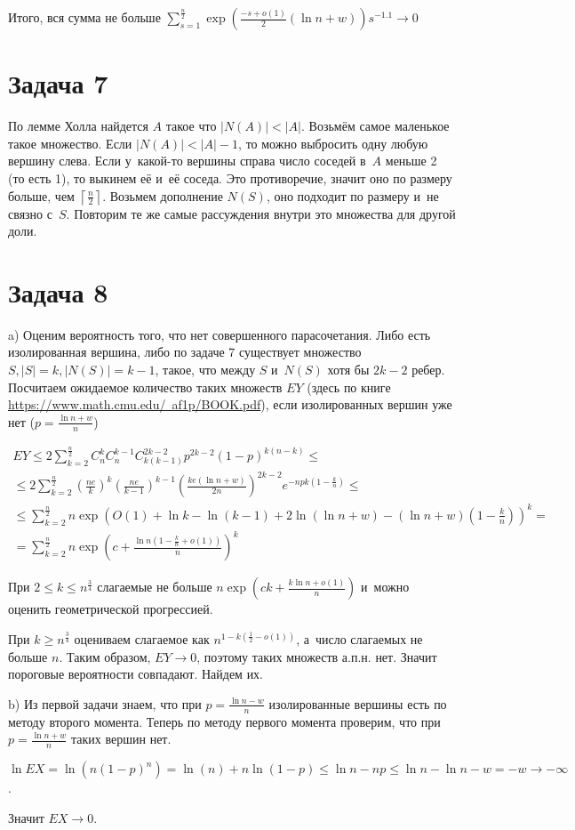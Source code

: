 \documentclass{article}
\theoremstyle{definition}
\theoremstyle{remark}
\renewcommand{\le}{\leqslant}
\renewcommand{\ge}{\geqslant}
\begin{document}
Итого, вся сумма не больше $\sum\limits_{s=1}^\frac{n}{2} \exp\left(\frac{-s+o(1)}{2}(\ln n + w)
\right) s^{-1.1} \rightarrow 0$

\section*{Задача 7}

По лемме Холла найдется $A$ такое что $|N(A)| < |A|$. Возьмём самое маленькое такое множество. Если
$|N(A)| < |A| - 1$, то можно выбросить одну любую вершину слева. Если у~какой-то вершины справа
число соседей в~$A$ меньше 2 (то есть 1), то выкинем её и~её соседа. Это противоречие, значит оно
по размеру больше, чем $\left\lceil \frac{n}{2} \right\rceil$. Возьмем дополнение $N(S)$, оно
подходит по размеру и~не связно с~$S$. Повторим те же самые рассуждения внутри это множества для
другой доли.

\section*{Задача 8}

a) Оценим вероятность того, что нет совершенного парасочетания. Либо есть изолированная вершина,
либо по задаче 7 существует множество $S, |S| = k, |N(S)| = k - 1$, такое, что между $S$ и~$N(S)$
хотя бы $2k - 2$ ребер. Посчитаем ожидаемое количество таких множеств $EY$
(здесь по книге
\href{https://www.math.cmu.edu/~af1p/BOOK.pdf}{https://www.math.cmu.edu/~af1p/BOOK.pdf}), если
изолированных вершин уже нет ($p = \frac{\ln n + w}{n}$)

\begin{multline*}
	EY \le 2\sum\limits_{k=2}^\frac{n}{2} C_n^k C_n^{k-1} C_{k(k-1)}^{2k-2} p^{2k-2} (1-p)^{k(n-k)}
	\le\\\le 2\sum\limits_{k=2}^\frac{n}{2} \left( \frac{ne}{k} \right)^k \left( \frac{ne}{k-1}
	\right)^{k-1} \left(\frac{ke(\ln n + w)}{2n} \right)^{2k-2} e^{-npk\left(1 - \frac{k}{n}\right)}
	\le\\\le \sum\limits_{k=2}^\frac{n}{2} n \exp\left(O(1) + \ln k - \ln(k-1) + 2\ln(\ln n + w) -
	(\ln n + w)\left(1 - \frac{k}{n}\right) \right)^k =\\= \sum\limits_{k=2}^\frac{n}{2} n\exp\left(c
	+ \frac{\ln n(1 - \frac{k}{n} + o(1))}{n} \right)^k
\end{multline*}

При $2 \le k \le n^\frac{3}{4}$ слагаемые не больше $n \exp\left(ck + \frac{k\ln n + o(1)}{n}\right)$
и~можно оценить геометрической прогрессией.

При $k \ge n^\frac{3}{4}$ оцениваем слагаемое как $n^{1 - k(\frac{1}{2} - o(1))}$, а~число слагаемых
не больше $n$. Таким образом, $EY \rightarrow 0$, поэтому таких множеств а.п.н. нет. Значит
пороговые вероятности совпадают. Найдем их.

b) Из первой задачи знаем, что при $p = \frac{\ln n - w}{n}$ изолированные вершины есть по методу
второго момента. Теперь по методу первого момента проверим, что при $p = \frac{\ln n + w}{n}$ таких
вершин нет.

$\ln EX = \ln( n(1-p)^n ) = \ln(n) + n\ln(1 - p) \le \ln n - np \le \ln n - \ln n - w = -w
\rightarrow -\infty$.

Значит $EX \rightarrow 0$.
\end{document}
